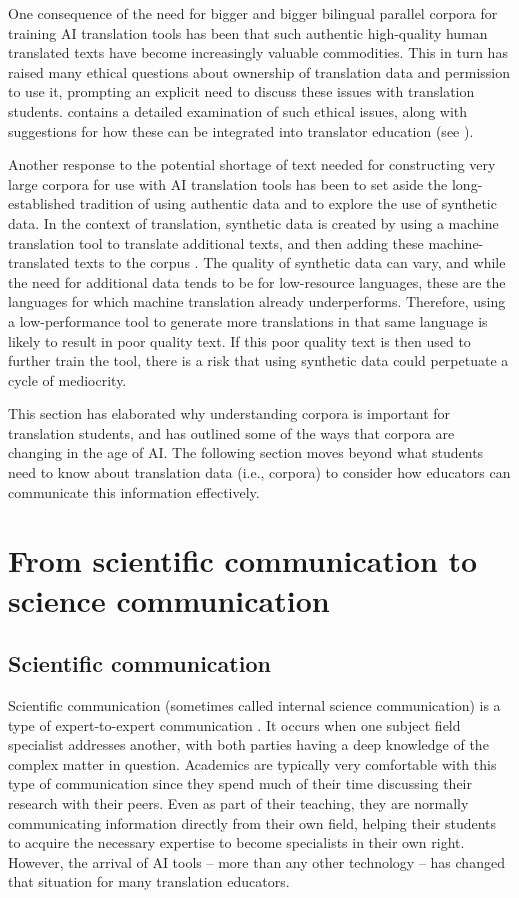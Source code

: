\documentclass[output=paper]{langscibook}
\begin{document}
One consequence of the need for bigger and bigger bilingual parallel corpora for training AI translation tools has been that such authentic high-quality human translated texts have become increasingly valuable commodities. This in turn has raised many ethical questions about ownership of translation data and permission to use it, prompting an explicit need to discuss these issues with translation students. \citet{moorkens2022_ethics} contains a detailed examination of such ethical issues, along with suggestions for how these can be integrated into translator education (see ).

Another response to the potential shortage of text needed for constructing very large corpora for use with AI translation tools has been to set aside the long-established tradition of using authentic data and to explore the use of synthetic data. In the context of translation, synthetic data is created by using a machine translation tool to translate additional texts, and then adding these machine-translated texts to the corpus \citep{sennrichhaddow16}. The quality of synthetic data can vary, and while the need for additional data tends to be for low-resource languages, these are the languages for which machine translation already underperforms. Therefore, using a low-performance tool to generate more translations in that same language is likely to result in poor quality text. If this poor quality text is then used to further train the tool, there is a risk that using synthetic data could perpetuate a cycle of mediocrity.

This section has elaborated why understanding corpora is important for translation students, and has outlined some of the ways that corpora are changing in the age of AI. The following section moves beyond what students need to know about translation data (i.e., corpora) to consider how educators can communicate this information effectively.

\section{From scientific communication to science communication}\label{sec:4:3}

\subsection{Scientific communication}\label{sec:4:3.1}
Scientific communication (sometimes called internal science communication) is a type of expert-to-expert communication \citep{hanauska19}. It occurs when one subject field specialist addresses another, with both parties having a deep knowledge of the complex matter in question. Academics are typically very comfortable with this type of communication since they spend much of their time discussing their research with their peers. Even as part of their teaching, they are normally communicating information directly from their own field, helping their students to acquire the necessary expertise to become specialists in their own right. However, the arrival of AI tools – more than any other technology – has changed that situation for many translation educators.
\end{document}
